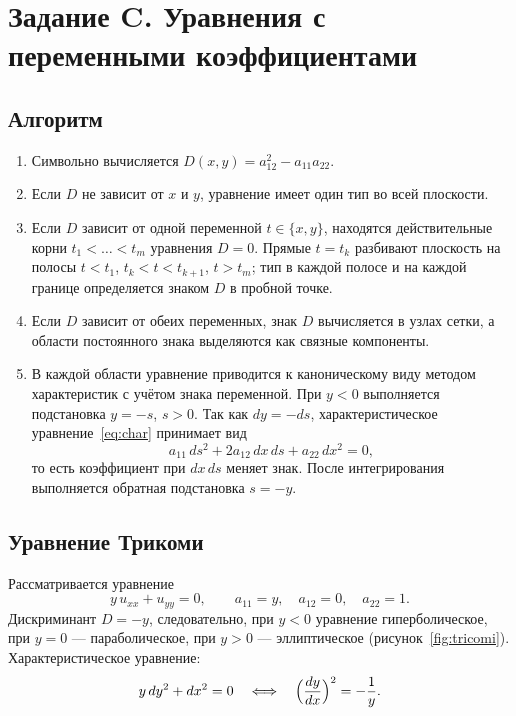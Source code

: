 \documentclass[a4paper,12pt]{article}
\begin{document}
\section{Задание C. Уравнения с переменными коэффициентами}

\subsection{Алгоритм}

\begin{enumerate}
  \item Символьно вычисляется $D(x,y)=a_{12}^2-a_{11}a_{22}$.
  \item Если $D$ не зависит от $x$ и $y$, уравнение имеет один тип во всей плоскости.
  \item Если $D$ зависит от одной переменной $t\in\{x,y\}$, находятся действительные
        корни $t_1<\dots<t_m$ уравнения $D=0$. Прямые $t=t_k$ разбивают плоскость на
        полосы $t<t_1$, $t_k<t<t_{k+1}$, $t>t_m$; тип в каждой полосе и на каждой
        границе определяется знаком $D$ в пробной точке.
  \item Если $D$ зависит от обеих переменных, знак $D$ вычисляется в узлах сетки,
        а области постоянного знака выделяются как связные компоненты.
  \item В каждой области уравнение приводится к каноническому виду методом
        характеристик с учётом знака переменной. При $y<0$ выполняется подстановка
        $y=-s$, $s>0$. Так как $dy=-ds$, характеристическое
        уравнение~\eqref{eq:char} принимает вид
        \begin{equation}\label{eq:charflip}
          a_{11}\,ds^2+2a_{12}\,dx\,ds+a_{22}\,dx^2=0,
        \end{equation}
        то есть коэффициент при $dx\,ds$ меняет знак. После интегрирования
        выполняется обратная подстановка $s=-y$.
\end{enumerate}

\subsection{Уравнение Трикоми}

Рассматривается уравнение
\begin{equation}\label{eq:tricomi}
  y\,u_{xx}+u_{yy}=0,\qquad a_{11}=y,\quad a_{12}=0,\quad a_{22}=1.
\end{equation}
Дискриминант $D=-y$, следовательно, при $y<0$ уравнение гиперболическое,
при $y=0$ --- параболическое, при $y>0$ --- эллиптическое
(рисунок~\ref{fig:tricomi}).
Характеристическое уравнение:
\[
  y\,dy^2+dx^2=0\quad\Longleftrightarrow\quad\Bigl(\frac{dy}{dx}\Bigr)^2=-\frac1y.
\]
\end{document}
